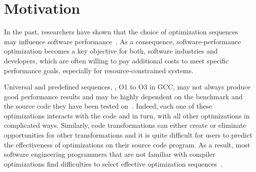 


\section{Motivation}
\label{sec:comp-motiv}

In the past, researchers have shown that the choice of optimization sequences may influence software performance~\cite{almagor2004finding,chen2012deconstructing}. 
As a consequence, software-performance optimization becomes a key objective for both, software industries and developers, which are often willing to pay additional costs to meet specific performance goals, especially for resource-constrained systems.

Universal and predefined sequences, \eg, O1 to O3 in GCC, may not always produce good performance results and may be highly dependent on the benchmark and the source code they have been tested on~\cite{hoste2008cole,chen2010evaluating,escobar2015evaluation}.
Indeed, each one of these optimizations interacts with the code and in turn, with all other optimizations in complicated ways. Similarly, code transformations can either create or eliminate opportunities for other transformations and it is quite difficult for users to predict the effectiveness of optimizations on their source code program.
As a result, most software engineering programmers that are not familiar with compiler optimizations find difficulties to select effective optimization sequences~\cite{almagor2004finding}.

